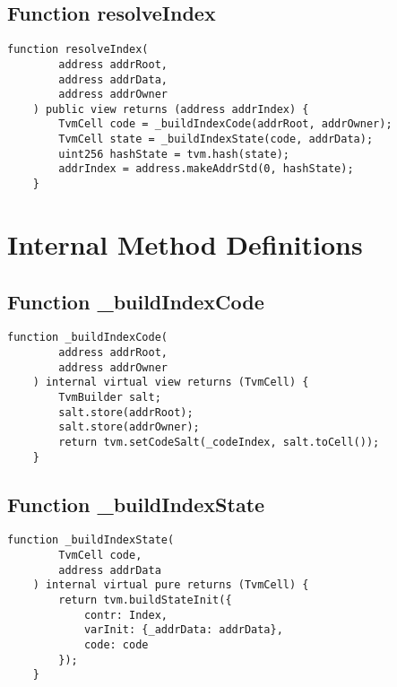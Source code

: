 \subsection{Function resolveIndex}

\begin{lstlisting}[firstnumber=20]
    function resolveIndex(
        address addrRoot,
        address addrData,
        address addrOwner
    ) public view returns (address addrIndex) {
        TvmCell code = _buildIndexCode(addrRoot, addrOwner);
        TvmCell state = _buildIndexState(code, addrData);
        uint256 hashState = tvm.hash(state);
        addrIndex = address.makeAddrStd(0, hashState);
    }
\end{lstlisting}

\section{Internal Method Definitions}


\subsection{Function \_{}buildIndexCode}

\begin{lstlisting}[firstnumber=31]
    function _buildIndexCode(
        address addrRoot,
        address addrOwner
    ) internal virtual view returns (TvmCell) {
        TvmBuilder salt;
        salt.store(addrRoot);
        salt.store(addrOwner);
        return tvm.setCodeSalt(_codeIndex, salt.toCell());
    }
\end{lstlisting}

\subsection{Function \_{}buildIndexState}

\begin{lstlisting}[firstnumber=41]
    function _buildIndexState(
        TvmCell code,
        address addrData
    ) internal virtual pure returns (TvmCell) {
        return tvm.buildStateInit({
            contr: Index,
            varInit: {_addrData: addrData},
            code: code
        });
    }
\end{lstlisting}
